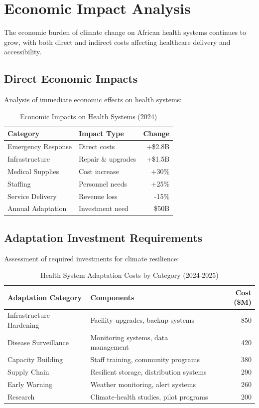 \section{Economic Impact Analysis}

The economic burden of climate change on African health systems continues to grow, with both direct and indirect costs affecting healthcare delivery and accessibility.

\subsection{Direct Economic Impacts}
Analysis of immediate economic effects on health systems:

\begin{table}[ht]
\footnotesize
\caption{Economic Impacts on Health Systems (2024)}
\label{tab:economic_impacts}
\begin{tabular}{@{}p{2.8cm}p{2.8cm}r@{}}
\toprule
\textbf{Category} & \textbf{Impact Type} & \textbf{Change} \\
\midrule
Emergency Response & Direct costs & +\$2.8B \\
Infrastructure & Repair \& upgrades & +\$1.5B \\
Medical Supplies & Cost increase & +30\% \\
Staffing & Personnel needs & +25\% \\
Service Delivery & Revenue loss & -15\% \\
Annual Adaptation & Investment need & \$50B \\
\bottomrule
\end{tabular}
\end{table}

\subsection{Adaptation Investment Requirements}
Assessment of required investments for climate resilience:

\begin{table}[ht]
\footnotesize
\caption{Health System Adaptation Costs by Category (2024-2025)}
\label{tab:adaptation_costs}
\begin{tabularx}{\columnwidth}{@{}lXr@{}}
\toprule
\textbf{Adaptation Category} & \textbf{Components} & \textbf{Cost (\$M)} \\
\midrule
Infrastructure Hardening & Facility upgrades, backup systems & 850 \\
Disease Surveillance & Monitoring systems, data management & 420 \\
Capacity Building & Staff training, community programs & 380 \\
Supply Chain & Resilient storage, distribution systems & 290 \\
Early Warning & Weather monitoring, alert systems & 260 \\
Research & Climate-health studies, pilot programs & 200 \\
\bottomrule
\end{tabularx}
\end{table}

